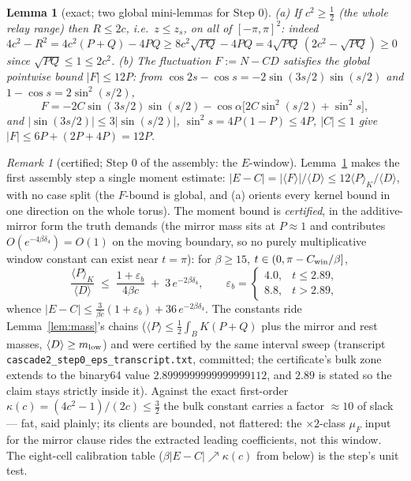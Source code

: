 \documentclass[11pt]{article}
\newtheorem{lemma}[theorem]{Lemma}
\theoremstyle{remark}
\newtheorem{remark}[theorem]{Remark}
\begin{document}
\begin{lemma}[exact; two global mini-lemmas for Step 0]
\label{lem:mini}
\textup{(a)} If $c^2\ge\tfrac12$ \textup{(}the whole relay
range\textup{)} then $R\le2c$, i.e.\ $z\le z_s$, on all of
$[-\pi,\pi]^2$: indeed $4c^2-R^2=4c^2(P+Q)-4PQ\ge
8c^2\sqrt{PQ}-4PQ=4\sqrt{PQ}\,(2c^2-\sqrt{PQ})\ge0$ since
$\sqrt{PQ}\le1\le2c^2$. \textup{(b)} The fluctuation
$F:=N-CD$ satisfies the global pointwise bound $|F|\le12P$: from
$\cos2s-\cos s=-2\sin(3s/2)\sin(s/2)$ and $1-\cos s=2\sin^2(s/2)$,
\[
F=-2C\sin(3s/2)\sin(s/2)-\cos\alpha\bigl[2C\sin^2(s/2)+\sin^2s\bigr],
\]
and $|\sin(3s/2)|\le3|\sin(s/2)|$, $\sin^2s=4P(1-P)\le4P$,
$|C|\le1$ give $|F|\le6P+(2P+4P)=12P$.
\end{lemma}

\begin{remark}[certified; Step 0 of the assembly: the $E$-window]
\label{rem:step0}
Lemma~\ref{lem:mini} makes the first assembly step a single moment
estimate: $|E-C|=|\langle F\rangle|/\langle D\rangle\le
12\langle P\rangle_K/\langle D\rangle$, with no case split
\textup{(}the $F$-bound is global, and \textup{(a)} orients every
kernel bound in one direction on the whole torus\textup{)}. The
moment bound is \emph{certified}, in the additive-mirror form the
truth demands \textup{(}the mirror mass sits at $P\approx1$ and
contributes $O(e^{-4\beta\delta_4})=O(1)$ on the moving boundary,
so no purely multiplicative window constant can exist near
$t=\pi$\textup{)}: for $\beta\ge15$,
$t\in(0,\pi-C_{\rm win}/\beta]$,
\[
\frac{\langle P\rangle_K}{\langle D\rangle}\;\le\;
\frac{1+\varepsilon_b}{4\beta c}\;+\;3\,e^{-2\beta\delta_4},
\qquad
\varepsilon_b=\begin{cases}4.0,&t\le2.89,\\[2pt]
8.8,&t>2.89,\end{cases}
\]
whence $|E-C|\le\tfrac{3}{\beta c}(1+\varepsilon_b)
+36\,e^{-2\beta\delta_4}$. The constants ride
Lemma~\ref{lem:mass}'s chains
\textup{(}$\langle P\rangle\le\tfrac12\int_BK(P+Q)$ plus the
mirror and rest masses, $\langle D\rangle\ge m_{\rm low}$\textup{)}
and were certified by the same interval sweep \textup{(}transcript
\texttt{cascade2\_step0\_eps\_transcript.txt}, committed; the
certificate's bulk zone extends to the binary64 value
$2.8999999999999999112$, and $2.89$ is stated so the claim stays
strictly inside it\textup{)}. Against the exact first-order
$\kappa(c)=(4c^2-1)/(2c)\le\tfrac32$ the bulk constant carries a
factor $\approx10$ of slack --- fat, said plainly; its clients are
bounded, not flattered: the $\times2$-class $\mu_F$ input for the
mirror clause rides the extracted leading coefficients, not this
window. The eight-cell calibration table
\textup{(}$\beta|E-C|\nearrow\kappa(c)$ from below\textup{)} is the
step's unit test.
\end{remark}
\end{document}
